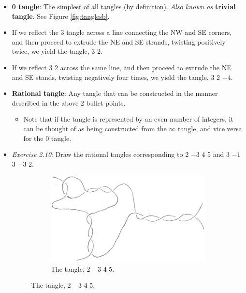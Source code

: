 \documentclass[titlepage]{article}
\numberwithin{figure}{section}
\numberwithin{table}{section}
\numberwithin{equation}{section}
\begin{document}
\begin{itemize}
\begin{figure}[h!]
\begin{subfigure}[b]{0.3\linewidth}
            \caption{The $3$ tangle.}
            \label{fig:tanglesc}
        \end{subfigure}
        \caption{Tangles.}
        \label{fig:tangles}
    \end{figure}
    \item \textbf{0 tangle}: The simplest of all tangles (by definition). \emph{Also known as} \textbf{trivial tangle}. See Figure \ref{fig:tanglesb}.
    \item If we reflect the 3 tangle across a line connecting the NW and SE corners, and then proceed to extrude the NE and SE strands, twisting positively twice, we yield the tangle, 3 2.
    \item If we reflect 3 2 across the same line, and then proceed to extrude the NE and SE stands, twisting negatively four times, we yield the tangle, 3 2 $-4$.
    \item \textbf{Rational tangle}: Any tangle that can be constructed in the manner described in the above 2 bullet points.
    \begin{itemize}
        \item Note that if the tangle is represented by an even number of integers, it can be thought of as being constructed from the $\infty$ tangle, and vice versa for the 0 tangle.
    \end{itemize}
    \item \emph{Exercise 2.10}: Draw the rational tangles corresponding to 2 $-3$ 4 5 and 3 $-1$ 3 $-3$ 2.
    \begin{figure}[H]
        \centering
        \begin{subfigure}[b]{0.4\linewidth}
            \centering
            \includegraphics[width=\linewidth]{Blender/ex2-10a.png}
            \caption{The tangle, 2 $-3$ 4 5.}
            \label{fig:ex2-10a}
        \end{subfigure}

\end{figure}
\end{itemize}
\end{document}
